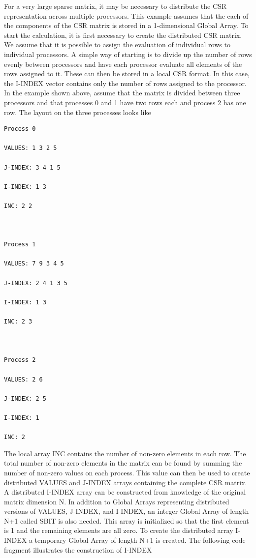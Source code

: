 For a very large sparse matrix, it may be necessary to distribute
the CSR representation across multiple processors. This example assumes
that the each of the components of the CSR matrix is stored in a 1-dimensional
Global Array. To start the calculation, it is first necessary to create
the distributed CSR matrix. We assume that it is possible to assign
the evaluation of individual rows to individual processors. A simple
way of starting is to divide up the number of rows evenly between
processors and have each processor evaluate all elements of the rows
assigned to it. These can then be stored in a local CSR format. In
this case, the I-INDEX vector contains only the number of rows assigned
to the processor. In the example shown above, assume that the matrix
is divided between three processors and that processes 0 and 1 have
two rows each and process 2 has one row. The layout on the three processes
looks like
\begin{verbatim}
Process 0 

VALUES: 1 3 2 5 

J-INDEX: 3 4 1 5 

I-INDEX: 1 3 

INC: 2 2



Process 1 

VALUES: 7 9 3 4 5 

J-INDEX: 2 4 1 3 5 

I-INDEX: 1 3 

INC: 2 3



Process 2 

VALUES: 2 6 

J-INDEX: 2 5 

I-INDEX: 1 

INC: 2 
\end{verbatim}
The local array INC contains the number of non-zero elements in each
row. The total number of non-zero elements in the matrix can be found
by summing the number of non-zero values on each process. This value
can then be used to create distributed VALUES and J-INDEX arrays containing
the complete CSR matrix. A distributed I-INDEX array can be constructed
from knowledge of the original matrix dimension N. In addition to
Global Arrays representing distributed versions of VALUES, J-INDEX,
and I-INDEX, an integer Global Array of length N+1 called SBIT is
also needed. This array is initialized so that the first element is
1 and the remaining elements are all zero. To create the distributed
array I-INDEX a temporary Global Array of length N+1 is created. The
following code fragment illustrates the construction of I-INDEX

